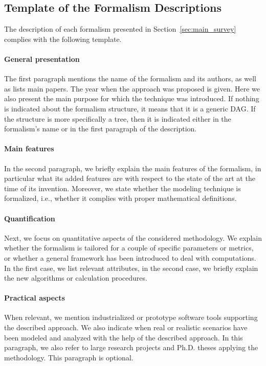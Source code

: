 \documentclass[a4paper]{article}
\begin{document}
\subsection{Template of the Formalism Descriptions}
\label{sec:template_of_formalisms}
The description of each formalism presented in 
Section~\ref{sec:main_survey} complies with the following template.

\paragraph{General presentation}
The first paragraph mentions the name of the formalism and its authors, as well
as lists main papers. The year when the approach was proposed is given. Here
we also present the main purpose for which the technique was introduced. 
If nothing is indicated about the formalism structure, it means that it is a
generic DAG. If the structure is more specifically a tree, then it is indicated
either in the formalism's name or in the first paragraph of the description.

\paragraph{Main features}
In the second paragraph, we briefly explain 
the main features of the formalism, in particular
what its added features are with respect to the state of 
the art at the time of its invention.
Moreover, we state whether the modeling technique is 
formalized, i.e., whether it complies with proper mathematical definitions.

\paragraph{Quantification}
Next, we focus on quantitative aspects of the considered methodology.
We explain whether the formalism
is tailored for a couple of specific parameters or metrics, or 
whether a general framework has been introduced to deal with
computations. 
In the first case, we list relevant attributes, in the second case, 
we briefly explain the new algorithms or calculation
procedures. 

\paragraph{Practical aspects}
When relevant, we mention industrialized or prototype software tools
supporting the described approach. We also indicate when real
or realistic scenarios have been modeled and analyzed with the help of the
described approach. In this paragraph, we also refer to
large research projects and Ph.D. theses applying the methodology. This
paragraph is optional.
\end{document}

